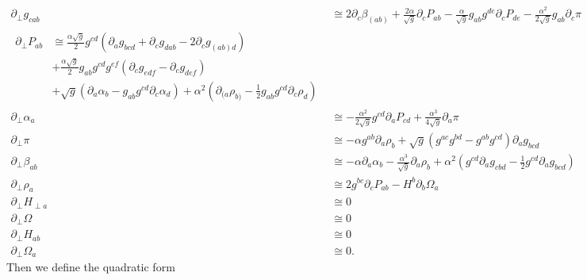 \begin{subequations}\label{symmetric hamilton}
\begin{align}
\partial_{\perp}g_{cab} & \cong 2\partial_{c}\beta_{(ab)} + \frac{2\alpha}{\sqrt{g}}\partial_{c}P_{ab} - \frac{\alpha}{\sqrt{g}}g_{ab}g^{de}\partial_{c}P_{de} - \frac{\alpha^{2}}{2\sqrt{g}}g_{ab}\partial_{c}\pi\\
\begin{split}
\partial_{\perp}P_{ab} & \cong \frac{\alpha\sqrt{g}}{2}g^{cd}\left(\partial_{a}g_{bcd} + \partial_{c}g_{dab} - 2\partial_{c}g_{(ab)d}\right)\\
& + \frac{\alpha \sqrt{g}}{2}g_{ab}g^{cd}g^{ef}\left(\partial_{c}g_{edf} - \partial_{c}g_{def}\right)\\
& + \sqrt{g}\left(\partial_{a}\alpha_{b} - g_{ab}g^{cd}\partial_{c}\alpha_{d}\right) + \alpha^{2}\left(\partial_{(a}\rho_{b)} - \frac{1}{2}g_{ab}g^{cd}\partial_{c}\rho_{d}\right)
\end{split}\\
\partial_{\perp}\alpha_{a} & \cong -\frac{\alpha^{2}}{2\sqrt{g}}g^{cd}\partial_{a}P_{cd} + \frac{\alpha^{3}}{4\sqrt{g}}\partial_{a}\pi\\
\partial_{\perp}\pi & \cong - \alpha g^{ab}\partial_{a}\rho_{b} + \sqrt{g}\left(g^{ac}g^{bd} - g^{ab}g^{cd}\right)\partial_{a}g_{bcd}\\
\partial_{\perp}\beta_{ab} & \cong -\alpha \partial_{a}\alpha_{b} - \frac{\alpha^{3}}{\sqrt{g}}\partial_{a}\rho_{b} + \alpha^{2}\left(g^{cd}\partial_{a}g_{cbd} - \frac{1}{2}g^{cd}\partial_{a}g_{bcd}\right)\\
\partial_{\perp}\rho_{a} & \cong 2g^{bc}\partial_{c}P_{ab} - H^{b}\partial_{b}\Omega_{a}\\
\partial_{\perp}H_{\perp a} & \cong 0\\
\partial_{\perp}\Omega & \cong 0\\
\partial_{\perp}H_{ab} & \cong 0\\
\partial_{\perp}\Omega_{a} & \cong 0.
\end{align}
\end{subequations}
Then we define the quadratic form
\tiny
